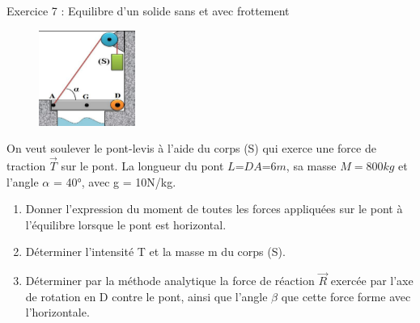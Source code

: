 \documentclass[12pt, french]{article}
\begin{document}
\begin{Box2}{Exercice 7 : Equilibre d’un solide sans et avec frottement  }
	\begin{figure}
  \begin{center}
	  \vspace{-0.9cm}
	\includegraphics[width=0.28\textwidth]{./img/ex06.png}
  \end{center}
\end{figure}

On veut soulever le pont-levis à l'aide du corps (S) qui exerce une force de traction $\vec{T}$ sur le pont. La longueur du pont   $L$=$DA$=$6 m$, sa masse
$M=800kg$ et l'angle $\alpha$ = 40°, avec g = 10N/kg.

\begin{enumerate}

	\item  Donner l'expression du moment de toutes les forces appliquées sur le
pont à l'équilibre lorsque le pont est horizontal.
\item  Déterminer l’intensité T et la masse m du corps (S).
\item  Déterminer par la méthode analytique la force de réaction $\vec{R}$ exercée
par l’axe de rotation en D contre le pont, ainsi que l’angle $\beta$ que cette
force forme avec l’horizontale.
\end{enumerate}

\end{Box2}
\end{document}
